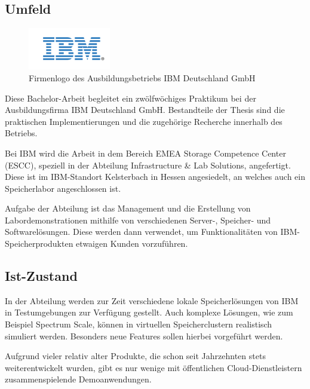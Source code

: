 \subsection{Umfeld} \label{subsec:enviroment}

\begin{figure}
	\begin{center}
		\includegraphics[width=0.32\textwidth]{images/firma-deckblatt}
	\end{center}
	\caption{Firmenlogo des Ausbildungsbetriebs IBM Deutschland GmbH}
\end{figure}

Diese Bachelor-Arbeit begleitet ein zwölfwöchiges Praktikum bei der Ausbildungsfirma IBM Deutschland GmbH. Bestandteile der Thesis sind die praktischen Implementierungen und die zugehörige Recherche innerhalb des Betriebs. 

Bei IBM wird die Arbeit in dem Bereich EMEA Storage Competence Center (ESCC), speziell in der Abteilung Infrastructure \& Lab Solutions, angefertigt. Diese ist im IBM-Standort Kelsterbach in Hessen angesiedelt, an welches auch ein Speicherlabor angeschlossen ist.

Aufgabe der Abteilung ist das Management und die Erstellung von Labordemonstrationen mithilfe von verschiedenen Server-, Speicher- und Softwarelösungen. Diese werden dann verwendet, um Funktionalitäten von IBM-Speicherprodukten etwaigen Kunden vorzuführen.

\subsection{Ist-Zustand}

In der Abteilung werden zur Zeit verschiedene lokale Speicherlösungen von IBM in Testumgebungen zur Verfügung gestellt. Auch komplexe Lösungen, wie zum Beispiel Spectrum Scale, können in virtuellen Speicherclustern realistisch simuliert werden. Besonders neue Features sollen hierbei vorgeführt werden.

Aufgrund vieler relativ alter Produkte, die schon seit Jahrzehnten stets weiterentwickelt wurden, gibt es nur wenige mit öffentlichen Cloud-Dienstleistern zusammenspielende Demoanwendungen.

